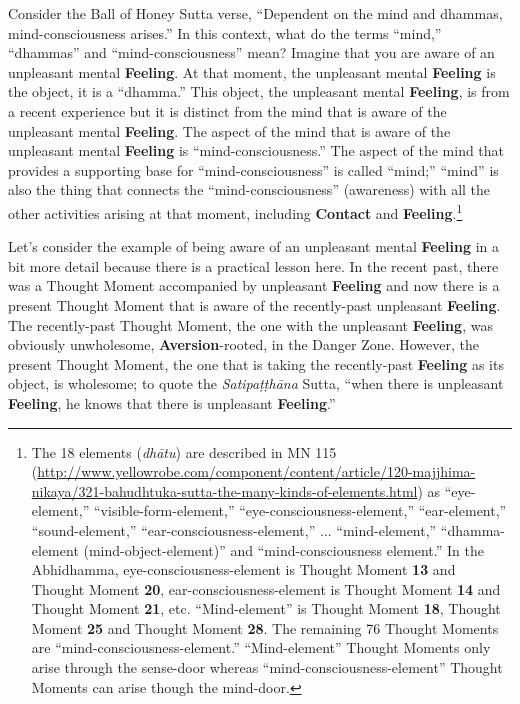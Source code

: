 Consider the Ball of Honey Sutta verse, “Dependent on the mind and dhammas, mind-consciousness arises.” In this context, what do the terms “mind,” “dhammas” and “mind-consciousness” mean? Imagine that you are aware of an unpleasant mental \textbf{Feeling}. At that moment, the unpleasant mental \textbf{Feeling} is the object, it is a “dhamma.” This object, the unpleasant mental \textbf{Feeling}, is from a recent experience but it is distinct from the mind that is aware of the unpleasant mental \textbf{Feeling}. The aspect of the mind that is aware of the unpleasant mental \textbf{Feeling} is “mind-consciousness.” The aspect of the mind that provides a supporting base for “mind-consciousness” is called “mind;” “mind” is also the thing that connects the “mind-consciousness” (awareness) with all the other activities arising at that moment, including \textbf{Contact} and \textbf{Feeling}.\footnote{The 18 elements (\textit{dhātu}) are described in MN 115 (\url{http://www.yellowrobe.com/component/content/article/120-majjhima-nikaya/321-bahudhtuka-sutta-the-many-kinds-of-elements.html}) as “eye-element,” “visible-form-element,” “eye-consciousness-element,” “ear-element,” “sound-element,” “ear-consciousness-element,” ... “mind-element,” “dhamma-element (mind-object-element)” and “mind-consciousness element.” In the Abhidhamma, eye-consciousness-element is Thought Moment \textbf{13} and Thought Moment \textbf{20}, ear-consciousness-element is Thought Moment \textbf{14} and Thought Moment \textbf{21}, etc. “Mind-element” is Thought Moment \textbf{18}, Thought Moment \textbf{25} and Thought Moment \textbf{28}. The remaining 76 Thought Moments are “mind-consciousness-element.” “Mind-element” Thought Moments only arise through the sense-door whereas “mind-consciousness-element” Thought Moments can arise though the mind-door.}

Let’s consider the example of being aware of an unpleasant mental \textbf{Feeling} in a bit more detail because there is a practical lesson here. In the recent past, there was a Thought Moment accompanied by unpleasant \textbf{Feeling} and now there is a present Thought Moment that is aware of the recently-past unpleasant \textbf{Feeling}. The recently-past Thought Moment, the one with the unpleasant \textbf{Feeling}, was obviously unwholesome, \textbf{Aversion}-rooted, in the Danger Zone. However, the present Thought Moment, the one that is taking the recently-past \textbf{Feeling} as its object, is wholesome; to quote the \textit{Satipaṭṭhāna} Sutta, “when there is unpleasant \textbf{Feeling}, he knows that there is unpleasant \textbf{Feeling}.”

